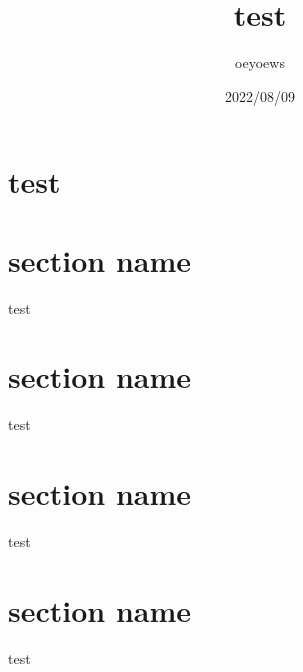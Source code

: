 \documentclass{article}
\title{test}
\author{oeyoews}
\date{2022/08/09}
\begin{document}
\maketitle


\section{test}%
\label{sec:test}

\section{section name}%
\label{sec:section name}
test

\section{section name}%
\label{sec:section name}
test

\section{section name}%
\label{sec:section name}
test

\section{section name}%
\label{sec:section name}
test
\end{document}
